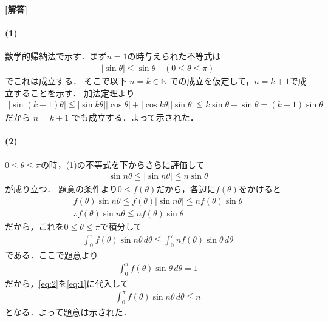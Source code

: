 \documentclass[../../main.tex]{subfiles}
\begin{document}
\begin{oframed}
  
\end{oframed}

{\bf [解答]}
\paragraph{(1)}
数学的帰納法で示す．まず$n=1$の時与えられた不等式は
\begin{align}
  |\sin\theta| \le \sin\theta \quad (0 \le \theta \le \pi)
\end{align}
でこれは成立する．
そこで以下 $n=k \in \mathbb{N}$ での成立を仮定して，$n=k+1$で成立することを示す．
加法定理より
\begin{align}
  |\sin(k+1)\theta| \leqq |\sin k\theta||\cos\theta| + |\cos k\theta||\sin\theta| \leqq k\sin\theta + \sin\theta = (k+1)\sin\theta
\end{align}
だから $n=k+1$ でも成立する．よって示された．

\paragraph{(2)}
$0\le\theta\le\pi$の時，(1)の不等式を下からさらに評価して
\begin{align}
  \sin n\theta \leqq |\sin n\theta| \leqq n \sin\theta
\end{align}
が成り立つ．
題意の条件より$0 \le f(\theta)$だから，各辺に$f(\theta)$をかけると
\begin{align}
  f(\theta) \sin n\theta \leqq f(\theta) |\sin n\theta| \leqq n f(\theta) \sin\theta \\
  \therefore
  f(\theta) \sin n\theta \leqq n f(\theta) \sin\theta
\end{align}
だから，これを$0\le\theta\le\pi$で積分して
\begin{align}
  \int_0^\pi f(\theta) \sin n\theta \, d\theta \leqq \int_0^\pi nf(\theta) \sin\theta \, d\theta \label{eq:1}
\end{align}
である．ここで題意より
\begin{align}
  \int_0^\pi f(\theta) \sin\theta \, d\theta = 1 \label{eq:2}
\end{align}
だから，\cref{eq:2}を\cref{eq:1}に代入して
\begin{align}
  \int_0^\pi f(\theta) \sin n\theta \, d\theta \leqq n
\end{align}
となる．よって題意は示された．
\end{document}
